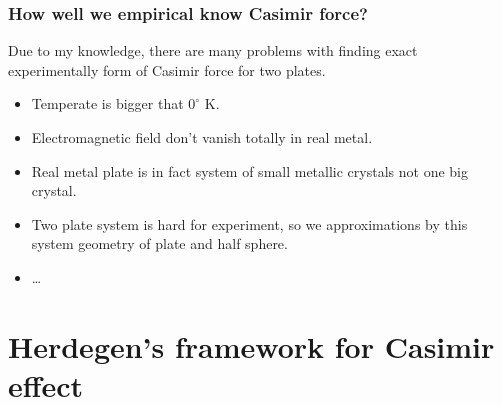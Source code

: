 \documentclass[10pt,t]{beamer}
\begin{document}
\begin{frame}
  \frametitle{How well we empirical know Casimir force?}


  Due to my knowledge, there are many problems with finding exact
  experimentally form of Casimir force for two plates.
  \begin{itemize}

  \item Temperate is bigger that $0^{ \circ }$ K.

  \item Electromagnetic field don't vanish totally in real metal.

  \item Real metal plate is in fact system of small metallic crystals
    not one big crystal.

  \item Two plate system is hard for experiment, so we approximations
    by this system geometry of plate and half sphere.

  \item \ldots

  \end{itemize}

\end{frame}










\section{Herdegen's framework for Casimir effect}
\end{document}
